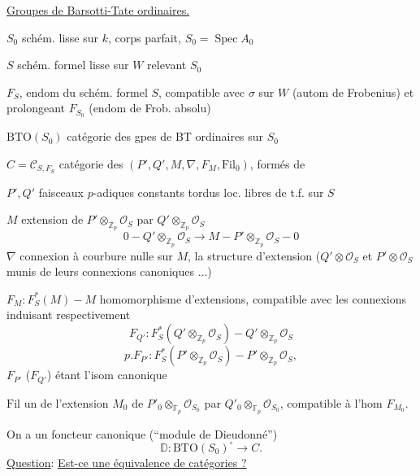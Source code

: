 \uline{Groupes de Barsotti-Tate ordinaires.}

$S_0$ schém. lisse sur $k$, corps parfait, $S_0=\operatorname{Spec}A_0$ 

$S$ schém. formel lisse sur $W$ relevant $S_0$

$F_S$, endom  du schém. formel $S$, compatible avec $\sigma$ sur $W$ (autom de Frobenius) et prolongeant $F_{S_0}$ (endom de Frob. absolu)

$\mathrm{BTO}(S_0)$ catégorie des gpes de BT ordinaires sur $S_0$

$C=\mathcal C_{S,F_S}$ catégorie des   $(P',Q',M,\nabla,F_M,\mathrm{Fil}_0)$, formés de

$P',Q'$ faisceaux $p$-adiques constants tordus  loc. libres de t.f. sur $S$

$M$ extension de $P'\otimes_{\mathbb Z_p}\mathcal O_S$ par $Q'\otimes_{\mathbb Z_p}\mathcal O_S$
\[
0\mathbin{-}Q'\otimes_{\mathbb Z_p}\mathcal O_S\longrightarrow M\mathbin{-}P'\otimes_{\mathbb Z_p}\mathcal O_S\mathbin{-}0
\]
$\nabla$ connexion à courbure nulle sur $M$,   la structure d'extension ($Q'\otimes\mathcal O_S$ et $P'\otimes\mathcal O_S$ munis de leurs connexions canoniques $\ldots$)

$F_M:F_S^*(M)\mathbin{-}M$ homomorphisme d'extensions, compatible avec les connexions induisant  respectivement
\[
F_{Q'}:F_S^*(Q'\otimes_{\mathbb Z_p}\mathcal O_S)\mathbin{-}Q'\otimes_{\mathbb Z_p}\mathcal O_S
\]
\[
p.F_{P'}:F_S^*(P'\otimes_{\mathbb Z_p}\mathcal O_S)\mathbin{-}P'\otimes_{\mathbb Z_p}\mathcal O_S,
\]
$F_{P'}$ ($F_{Q'}$) étant l'isom canonique

$\mathrm{Fil}$ un   de l'extension $M_0$ de $P'_0\otimes_{\mathbb F_p}\mathcal O_{S_0}$ par $Q'_0\otimes_{\mathbb F_p}\mathcal O_{S_0}$, compatible à l'hom $F_{M_0}$.

On a un foncteur canonique (``module de Dieudonné'')
\[
\mathbb D:\mathrm{BTO}(S_0)^\circ\longrightarrow C.
\]
\uline{Question}: \uline{Est-ce une équivalence de catégories ?}
